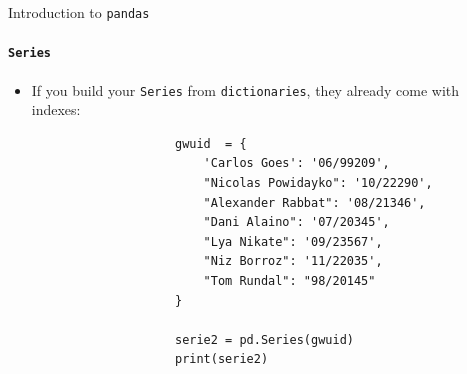 \documentclass[notes,11pt, aspectratio=169, xcolor=table]{beamer}
\begin{document}
        \begin{frame}[fragile=singleslide]{Introduction to \texttt{pandas}}
        \framesubtitle{\texttt{Series}}
            
             \begin{itemize}
    
                \item If you build your \texttt{Series} from \texttt{dictionaries}, they already come with indexes:
    
                    \begin{verbatim}
                    gwuid  = {
                        'Carlos Goes': '06/99209',
                        "Nicolas Powidayko": '10/22290',
                        "Alexander Rabbat": '08/21346',
                        "Dani Alaino": '07/20345',
                        "Lya Nikate": '09/23567',
                        "Niz Borroz": '11/22035',
                        "Tom Rundal": "98/20145"
                    }
                    
                    serie2 = pd.Series(gwuid)
                    print(serie2)

                    \end{verbatim}
                
                    
            \end{itemize}             
    
        \end{frame}    
\end{document}
